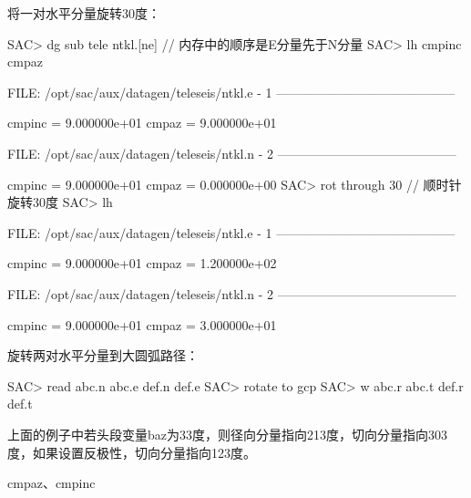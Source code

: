 将一对水平分量旋转30度：
\begin{SACCode}
SAC> dg sub tele ntkl.[ne]          // 内存中的顺序是E分量先于N分量
SAC> lh cmpinc cmpaz

  FILE: /opt/sac/aux/datagen/teleseis/ntkl.e - 1
 ------------------------------------------

     cmpinc = 9.000000e+01
      cmpaz = 9.000000e+01

  FILE: /opt/sac/aux/datagen/teleseis/ntkl.n - 2
 ------------------------------------------

     cmpinc = 9.000000e+01
      cmpaz = 0.000000e+00
SAC> rot through 30                 // 顺时针旋转30度
SAC> lh

  FILE: /opt/sac/aux/datagen/teleseis/ntkl.e - 1
 ------------------------------------------

     cmpinc = 9.000000e+01
      cmpaz = 1.200000e+02

  FILE: /opt/sac/aux/datagen/teleseis/ntkl.n - 2
 ------------------------------------------

     cmpinc = 9.000000e+01
      cmpaz = 3.000000e+01
\end{SACCode}

旋转两对水平分量到大圆弧路径：
\begin{SACCode}
SAC> read abc.n abc.e def.n def.e
SAC> rotate to gcp
SAC> w abc.r abc.t def.r def.t
\end{SACCode}
上面的例子中若头段变量baz为33度，则径向分量指向213度，切向分量指向303度，如果设置反极性，切向分量指向123度。

cmpaz、cmpinc
